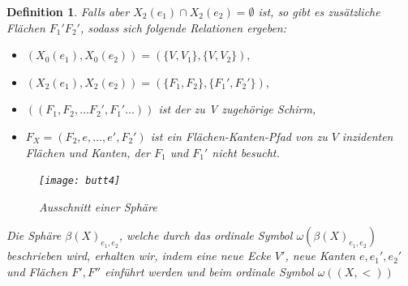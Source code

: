 \documentclass[12pt,titlepage,twoside,cleardoublepage]{article}
\theoremstyle{nummermitklammern}
\newtheorem{definition}[temp]{Definition}
\newtheorem{definition}[zahl]{Definition}
\numberwithin{equation}{section}
\begin{document}
\begin{definition}

Falls aber $X_2(e_1)\cap X_2(e_2)=\emptyset$ ist, so gibt es zusätzliche Flächen $F_1'F_2'$, sodass sich folgende Relationen ergeben: 
\begin{itemize}
\item $(X_0(e_1),X_0(e_2))=(\{V,V_1\},\{V,V_2\}),$
\item $(X_2(e_1),X_2(e_2))=(\{F_1,F_2\},\{F_1',F_2'\}),$
\item $((F_1,F_2,\ldots F_2',F_1'\ldots))$ ist der zu V zugehörige Schirm,
\item $F_X=(F_2,e,\ldots,e',F_2')$ ist ein Flächen-Kanten-Pfad von zu $V$ inzidenten Flächen und Kanten, der $F_1$ und $F_1'$ nicht besucht.
\end{itemize}

\begin{figure}[H]
\begin{center}
\texttt{[image: butt4]}
\end{center}
\caption{Ausschnitt einer Sphäre}
\end{figure}

Die Sphäre $\beta(X)_{e_1,e_2}$, welche durch das ordinale Symbol $\omega(\beta(X)_{e_1,e_2})$ beschrieben wird, erhalten wir, indem eine neue Ecke $V'$, neue Kanten $e,e_1',e_2'$ und Flächen $F',F''$ einführt werden und beim ordinale Symbol $\omega((X,<))$


\end{definition}
\end{document}
